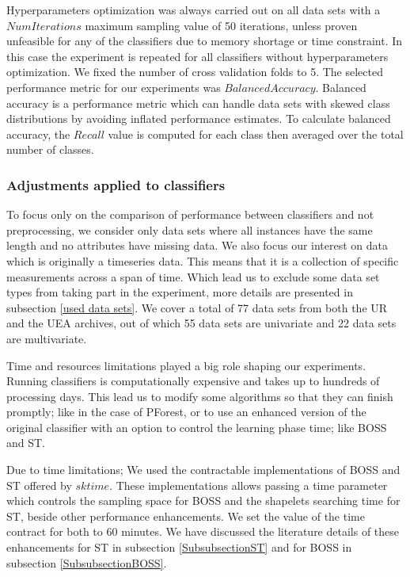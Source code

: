 Hyperparameters optimization was always carried out on all data sets with a $NumIterations$ maximum sampling value of 50 iterations, unless proven unfeasible for any of the classifiers due to memory shortage or time constraint.
In this case the experiment is repeated for all classifiers without hyperparameters optimization. We fixed the number of cross validation folds to 5.
The selected performance metric for our experiments was $Balanced Accuracy$.
Balanced accuracy is a performance metric which can handle data sets with skewed class distributions by avoiding inflated performance estimates.
To calculate balanced accuracy, the $Recall$ value is computed for each class then averaged over the total number of classes.

\subsubsection{Adjustments applied to classifiers}
\label{SubsectionIncludedClassifiers}
To focus only on the comparison of performance between classifiers and not preprocessing, we consider only data sets where all instances have the same length and no attributes have missing data.
We also focus our interest on data which is originally a timeseries data. This means that it is a collection of specific measurements across a span of time.
Which lead us to exclude some data set types from taking part in the experiment, more details are presented in subsection \ref{used data sets}.
We cover a total of 77 data sets from both the UR and the UEA archives, out of which 55 data sets are univariate and 22 data sets are multivariate.

Time and resources limitations played a big role shaping our experiments. Running classifiers is computationally expensive \cite{schafer2020teaser}
and takes up to hundreds of processing days.
This lead us to modify some algorithms so that they can finish promptly; like in the case of PForest, or to use an enhanced version of the original
classifier with an option to control the learning phase time; like BOSS and ST.

Due to time limitations; We used the contractable implementations of BOSS and ST offered by $sktime$.
These implementations allows passing a time parameter which controls the sampling space for BOSS and the shapelets searching time for ST,
beside other performance enhancements.
We set the value of the time contract for both to 60 minutes.
We have discussed the literature details of these enhancements for ST in subsection \ref{SubsubsectionST} and for BOSS in subsection \ref{SubsubsectionBOSS}.

